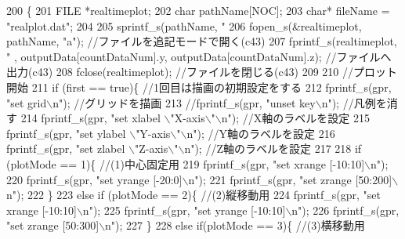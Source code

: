 \begin{DoxyCode}
200 \{
201     FILE *realtimeplot; 
202     \textcolor{keywordtype}{char} pathName[NOC]; 
203     \textcolor{keywordtype}{char}* fileName = \textcolor{stringliteral}{"realplot.dat"}; 
204 
205     sprintf\_s(pathName, \textcolor{stringliteral}{"%
206     fopen\_s(&realtimeplot, pathName, \textcolor{stringliteral}{"a"}); \textcolor{comment}{//ファイルを追記モードで開く(c43)}
207     fprintf\_s(realtimeplot, \textcolor{stringliteral}{"%
      , outputData[countDataNum].y, outputData[countDataNum].z); \textcolor{comment}{//ファイルへ出力(c43)}
208     fclose(realtimeplot); \textcolor{comment}{//ファイルを閉じる(c43)}
209 
210     \textcolor{comment}{//プロット開始}
211     \textcolor{keywordflow}{if} (first == \textcolor{keyword}{true})\{ \textcolor{comment}{//1回目は描画の初期設定をする}
212         fprintf\_s(gpr, \textcolor{stringliteral}{"set grid\(\backslash\)n"}); \textcolor{comment}{//グリッドを描画}
213         \textcolor{comment}{//fprintf\_s(gpr, "unset key\(\backslash\)n"); //凡例を消す}
214         fprintf\_s(gpr, \textcolor{stringliteral}{"set xlabel \(\backslash\)"X-axis\(\backslash\)"\(\backslash\)n"}); \textcolor{comment}{//X軸のラベルを設定}
215         fprintf\_s(gpr, \textcolor{stringliteral}{"set ylabel \(\backslash\)"Y-axis\(\backslash\)"\(\backslash\)n"}); \textcolor{comment}{//Y軸のラベルを設定}
216         fprintf\_s(gpr, \textcolor{stringliteral}{"set zlabel \(\backslash\)"Z-axis\(\backslash\)"\(\backslash\)n"}); \textcolor{comment}{//Z軸のラベルを設定}
217 
218         \textcolor{keywordflow}{if} (plotMode == 1)\{ \textcolor{comment}{//(1)中心固定用}
219             fprintf\_s(gpr, \textcolor{stringliteral}{"set xrange [-10:10]\(\backslash\)n"});
220             fprintf\_s(gpr, \textcolor{stringliteral}{"set yrange [-20:0]\(\backslash\)n"});
221             fprintf\_s(gpr, \textcolor{stringliteral}{"set zrange [50:200]\(\backslash\)n"});
222         \}
223         \textcolor{keywordflow}{else} \textcolor{keywordflow}{if} (plotMode == 2)\{ \textcolor{comment}{//(2)縦移動用}
224             fprintf\_s(gpr, \textcolor{stringliteral}{"set xrange [-10:10]\(\backslash\)n"});
225             fprintf\_s(gpr, \textcolor{stringliteral}{"set yrange [-10:10]\(\backslash\)n"});
226             fprintf\_s(gpr, \textcolor{stringliteral}{"set zrange [50:300]\(\backslash\)n"});
227         \}
228         \textcolor{keywordflow}{else} \textcolor{keywordflow}{if}(plotMode == 3)\{ \textcolor{comment}{//(3)横移動用}
}}
\end{DoxyCode}
